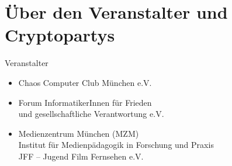 \section{Über den Veranstalter und Cryptopartys}
\begin{frame}{Veranstalter}
  \begin{itemize}
    \item Chaos Computer Club München e.V.
    \item Forum InformatikerInnen für Frieden\\und gesellschaftliche Verantwortung e.V.
    \item Medienzentrum München (MZM)\\Institut für Medienpädagogik in Forschung und Praxis\\JFF -- Jugend Film Fernsehen e.V.
  \end{itemize}
\end{frame}

\endinput
